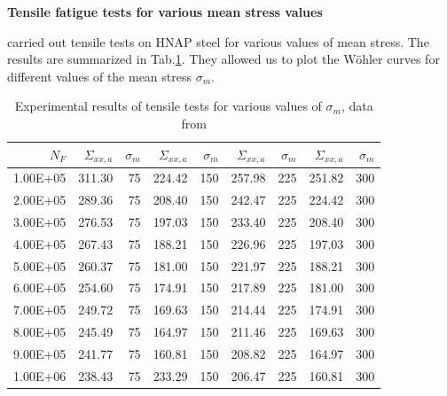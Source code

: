 \documentclass[3p,times,procedia,number]{elsarticle}
\begin{document}
\noindent
\vspace{6pt}
\textbf{Tensile fatigue tests for various mean stress values}
\vspace{6pt}

\cite{VIDAL1996} carried out tensile tests on HNAP steel for various values of mean stress. The results are summarized in Tab.\ref{tab.10HNAPmean}. They allowed us to plot the Wöhler curves for different values of the mean stress $\sigma_m$. 

\begin{table}[!h]
	\centering
	\begin{tabular}{r|rr|rr|rr|rr}
		\hline
		$N_F$    & $\Sigma_{xx,a}$ & $\sigma_m$ & $\Sigma_{xx,a}$ & $\sigma_m$ & $\Sigma_{xx,a}$ & $\sigma_m$ & $\Sigma_{xx,a}$ & $\sigma_m$ \\ \hline
		1.00E+05 & 311.30          & 75         & 224.42          & 150        & 257.98          & 225        & 251.82          & 300        \\
		2.00E+05 & 289.36          & 75         & 208.40          & 150        & 242.47          & 225        & 224.42          & 300        \\
		3.00E+05 & 276.53          & 75         & 197.03          & 150        & 233.40          & 225        & 208.40          & 300        \\
		4.00E+05 & 267.43          & 75         & 188.21          & 150        & 226.96          & 225        & 197.03          & 300        \\
		5.00E+05 & 260.37          & 75         & 181.00          & 150        & 221.97          & 225        & 188.21          & 300        \\
		6.00E+05 & 254.60          & 75         & 174.91          & 150        & 217.89          & 225        & 181.00          & 300        \\
		7.00E+05 & 249.72          & 75         & 169.63          & 150        & 214.44          & 225        & 174.91          & 300        \\
		8.00E+05 & 245.49          & 75         & 164.97          & 150        & 211.46          & 225        & 169.63          & 300        \\
		9.00E+05 & 241.77          & 75         & 160.81          & 150        & 208.82          & 225        & 164.97          & 300        \\
		1.00E+06 & 238.43          & 75         & 233.29          & 150        & 206.47          & 225        & 160.81          & 300        \\ \hline
	\end{tabular}
	\caption{Experimental results of tensile tests for various values of $\sigma_m$, data from \cite{VIDAL1996}}
	\label{tab.10HNAPmean}
\end{table}
\end{document}
